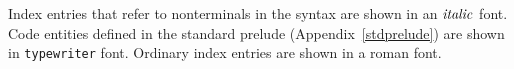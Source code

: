 Index entries that refer to nonterminals in the \Haskell{} syntax are
shown in an \mbox{$\it italic$} font.  Code entities defined in the standard
prelude (Appendix~\ref{stdprelude}) are shown in \mbox{\tt typewriter} font.
Ordinary index entries are shown in a roman font.
